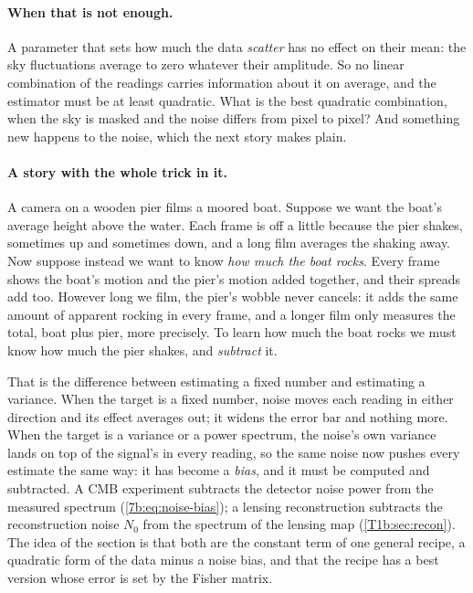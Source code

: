\paragraph{When that is not enough.}
A parameter that sets how much the data \emph{scatter} has no effect on
their mean: the sky fluctuations average to zero whatever their amplitude.
So no linear combination of the readings carries information about it on
average, and the estimator must be at least quadratic. What is the best
quadratic combination, when the sky is masked and the noise differs from
pixel to pixel? And something new happens to the noise, which the next story
makes plain.

\paragraph{A story with the whole trick in it.}
A camera on a wooden pier films a moored boat. Suppose we want the boat's
average height above the water. Each frame is off a little because the pier
shakes, sometimes up and sometimes down, and a long film averages the
shaking away. Now suppose instead we want to know \emph{how much the boat
rocks}. Every frame shows the boat's motion and the pier's motion added
together, and their spreads add too. However long we film, the pier's wobble
never cancels: it adds the same amount of apparent rocking in every frame,
and a longer film only measures the total, boat plus pier, more precisely. To
learn how much the boat rocks we must know how much the pier shakes, and
\emph{subtract} it.

That is the difference between estimating a fixed number and estimating a
variance. When the target is a fixed number, noise moves each reading in
either direction and its effect averages out; it widens the error bar and
nothing more. When the target is a variance or a power spectrum, the
noise's own variance lands on top of the signal's in every reading, so
the same noise now pushes every estimate the same way: it has become a
\emph{bias}, and it must be computed and subtracted. A CMB experiment
subtracts the detector noise power from the measured spectrum
(\cref{7b:eq:noise-bias}); a lensing reconstruction subtracts the
reconstruction noise $N_0$ from the spectrum of the lensing map
(\cref{T1b:sec:recon}). The idea of the section is that both are the
constant term of one general recipe, a quadratic form of the data minus a
noise bias, and that the recipe has a best version whose error is set by
the Fisher matrix.

